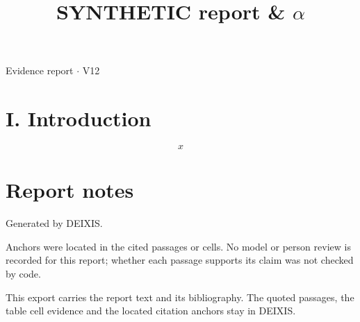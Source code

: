 \documentclass[journal]{IEEEtran}
\begin{document}
\title{SYNTHETIC report \& \ensuremath{\alpha}}

\maketitle

\noindent Evidence report \ensuremath{\cdot} V12

\section*{I. Introduction}

\begin{equation*}
x
\end{equation*}
\cite{Synth26}

\section*{Report notes}

Generated by DEIXIS.

Anchors were located in the cited passages or cells. No model or person review is recorded for this report; whether each passage supports its claim was not checked by code.

This export carries the report text and its bibliography. The quoted passages, the table cell evidence and the located citation anchors stay in DEIXIS.




\end{document}
